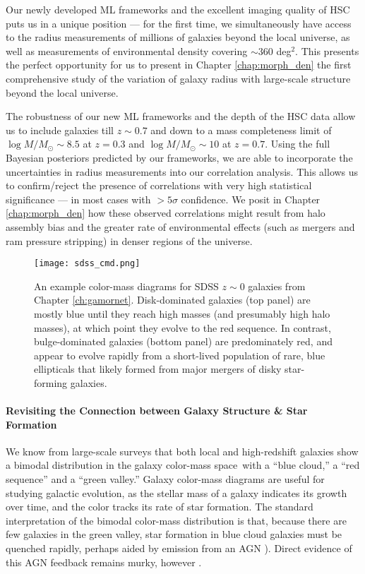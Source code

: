 Our newly developed ML frameworks and the excellent imaging quality of HSC puts us in a unique position --- for the first time, we simultaneously have access to the radius measurements of millions of galaxies beyond the local universe, as well as measurements of environmental density covering $\sim360$ deg$^2$. This presents the perfect opportunity for us to present in Chapter \ref{chap:morph_den} the first comprehensive study of the variation of galaxy radius with large-scale structure beyond the local universe. 

The robustness of our new ML frameworks and the depth of the HSC data allow us to include galaxies till $z\sim0.7$ and down to a mass completeness limit of $\log M/M_{\odot} \sim 8.5$ at $z=0.3$ and $\log M/M_{\odot} \sim 10$ at $z=0.7$. Using the full Bayesian posteriors predicted by our frameworks, we are able to incorporate the uncertainties in radius measurements into our correlation analysis. This allows us to confirm/reject the presence of correlations with very high statistical significance --- in most cases with $>5\sigma$ confidence. We posit in Chapter \ref{chap:morph_den} how these observed correlations might result from halo assembly bias and the greater rate of environmental effects (such as mergers and ram pressure stripping) in denser regions of the universe. 

\begin{wrapfigure}{R}{0.4\textwidth}
\centering
\vspace{-0.2in}
\texttt{[image: sdss\_cmd.png]}
\vspace{-0.4in}
\caption{An example color-mass diagrams for SDSS $z\sim0$ galaxies from Chapter \ref{ch:gamornet}. Disk-dominated galaxies (top panel) are mostly blue until they reach high masses (and presumably high halo masses), at which point they evolve to the red sequence. In contrast, bulge-dominated galaxies (bottom panel) are predominately red, and appear to evolve rapidly from a short-lived population of rare, blue ellipticals that likely formed from major mergers of disky star-forming galaxies.}
\label{fig_intro:sdss_cmd}
\vspace{-0.2in}
\end{wrapfigure}

\paragraph{Revisiting the Connection between Galaxy Structure \& Star Formation} We know from large-scale surveys that both local and high-redshift galaxies show a bimodal distribution in the galaxy color-mass space\,\citep[e.g.,][]{strateva_01,baldry_04,baldry_06,brammer_09} with a ``blue cloud,'' a ``red sequence'' and a ``green valley.'' Galaxy color-mass diagrams are useful for studying galactic evolution, as the stellar mass of a galaxy indicates its growth over time, and the color tracks its rate of star formation. The standard interpretation of the bimodal color-mass distribution is that, because there are few galaxies in the green valley, star formation in blue cloud galaxies must be quenched rapidly, perhaps aided by emission from an AGN \citep[e.g.,][]{bell_04,faber_07}). Direct evidence of this AGN feedback remains murky, however \citep{harrison_17}.

